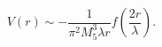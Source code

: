 \begin{equation}
\label{rev10}
V(r) \sim -\frac{1}{\pi^2 M_5^3 \lambda r}
f\left(\frac{2 r}{\lambda} \right).
\end{equation}


